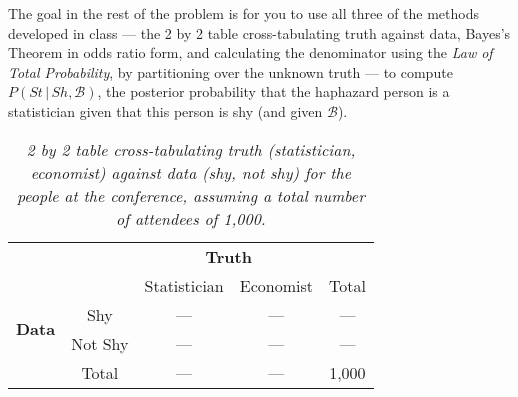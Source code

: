 \documentclass[12pt]{article}
\newcommand{\given}{\, | \,}
\begin{document}
The goal in the rest of the problem is for you to use all three of the methods developed in class --- the 2 by 2 table cross-tabulating truth against data, Bayes's Theorem in odds ratio form, and calculating the denominator using the \textit{Law of Total Probability}, by partitioning over the unknown truth --- to compute $P ( St \given Sh, \mathcal{ B } )$, the posterior probability that the haphazard person is a statistician given that this person is shy (and given $\mathcal{ B }$).

\begin{table}[t!]

\centering

\caption{\textit{2 by 2 table cross-tabulating truth (statistician, economist) against data (shy, not shy) for the people at the conference, assuming a total number of attendees of 1,000.}}

\label{t:basic-table-1}

\bigskip

\begin{tabular}{cc|c|c|c}

& \multicolumn{1}{c}{} & \multicolumn{2}{c}{\textbf{Truth}} \\

& \multicolumn{1}{c}{} & \multicolumn{1}{c}{Statistician} & \multicolumn{1}{c}{Economist}  & Total \\ \cline{3-4}

\multirow{2}{*}{\textbf{Data}} & Shy & --- & --- & --- \\ \cline{3-4}

& Not Shy & --- & --- & --- \\ \cline{3-4}

& \multicolumn{1}{c}{Total} & \multicolumn{1}{c}{---} & \multicolumn{1}{c}{---} & 1,000

\end{tabular}

\end{table}
\end{document}
